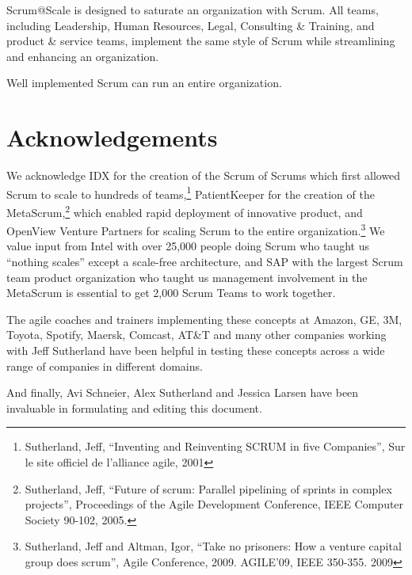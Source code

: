 \documentclass[12pt,a4paper,parskip=full]{scrartcl}
\begin{document}
Scrum@Scale is designed to saturate an organization with Scrum. All teams, including Leadership, Human Resources, Legal, Consulting \& Training, and product \& service teams, implement the same style of Scrum while streamlining and enhancing an organization.

Well implemented Scrum can run an entire organization.

\section{Acknowledgements}

We acknowledge IDX for the creation of the Scrum of Scrums which first allowed Scrum to scale to hundreds of teams,\footnote{Sutherland, Jeff, ``Inventing and Reinventing SCRUM in five Companies'', Sur le site officiel de l'alliance agile, 2001} PatientKeeper for the creation of the MetaScrum,\footnote{Sutherland, Jeff, ``Future of scrum: Parallel pipelining of sprints in complex projects'', Proceedings of the Agile Development Conference,  IEEE Computer Society 90-102,  2005.} which enabled rapid deployment of innovative product, and OpenView Venture Partners for scaling Scrum to the entire organization.\footnote{Sutherland, Jeff and Altman, Igor, ``Take no prisoners: How a venture capital group does scrum'', Agile Conference, 2009. AGILE'09, IEEE 350-355.  2009} We value input from Intel with over 25,000 people doing Scrum who taught us ``nothing scales'' except a scale-free architecture, and SAP with the largest Scrum team product organization who taught us management involvement in the MetaScrum is essential to get 2,000 Scrum Teams to work together.

The agile coaches and trainers implementing these concepts at Amazon, GE, 3M, Toyota, Spotify, Maersk, Comcast, AT\&T and many other companies working with Jeff Sutherland have been helpful in testing these concepts across a wide range of companies in different domains.

And finally, Avi Schneier, Alex Sutherland and Jessica Larsen have been invaluable in formulating and editing this document.

\pagebreak

\printbibliography
\end{document}
